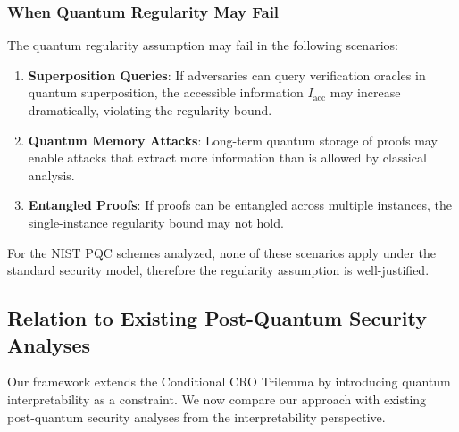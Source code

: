 \documentclass{ieeeaccess}
\begin{document}
\subsubsection{When Quantum Regularity May Fail}

The quantum regularity assumption may fail in the following scenarios:

\begin{enumerate}
    \item \textbf{Superposition Queries}: If adversaries can query verification oracles in quantum superposition, the accessible information $I_{\mathrm{acc}}$ may increase dramatically, violating the regularity bound.

    \item \textbf{Quantum Memory Attacks}: Long-term quantum storage of proofs may enable attacks that extract more information than is allowed by classical analysis.

    \item \textbf{Entangled Proofs}: If proofs can be entangled across multiple instances, the single-instance regularity bound may not hold.
\end{enumerate}

For the NIST PQC schemes analyzed, none of these scenarios apply under the standard security model, therefore the regularity assumption is well-justified.

\subsection{Relation to Existing Post-Quantum Security Analyses}

Our framework extends the Conditional CRO Trilemma by introducing quantum interpretability as a constraint. We now compare our approach with existing post-quantum security analyses from the interpretability perspective.
\end{document}
